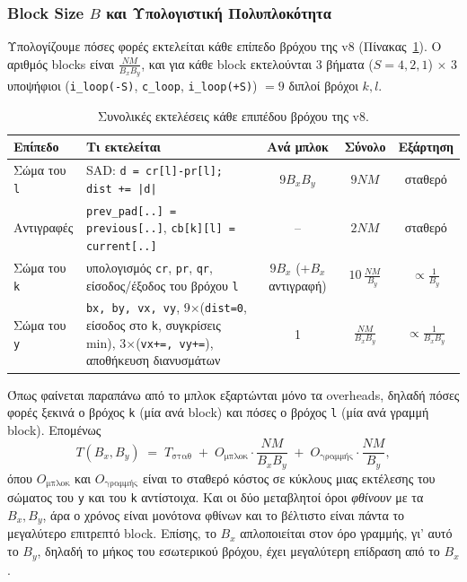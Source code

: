 \documentclass[11pt,a4paper]{article}
\newcommand{\code}[1]{\texttt{#1}}
\newcommand{\en}[1]{\foreignlanguage{english}{#1}}
\begin{document}
\subsubsection*{Block Size $B$ και Υπολογιστική Πολυπλοκότητα}

Υπολογίζουμε πόσες φορές εκτελείται κάθε επίπεδο
βρόχου της v8 (Πίνακας~\ref{tab:loop_levels}). Ο αριθμός blocks είναι $\frac{NM}{B_xB_y}$, και για
κάθε block εκτελούνται 3 βήματα ($S=4,2,1$) $\times$ 3 υποψήφιοι (\code{i\_loop(-S)},
\code{c\_loop}, \code{i\_loop(+S)}) $=9$ διπλοί βρόχοι $k,l$.

\begin{table}[H]
\centering
\caption{Συνολικές εκτελέσεις κάθε επιπέδου βρόχου της v8.}
\label{tab:loop_levels}
\small
\begin{tabularx}{\textwidth}{@{}l X c c c@{}}
\toprule
\textbf{Επίπεδο} & \textbf{Τι εκτελείται} & \textbf{Ανά μπλοκ} & \textbf{Σύνολο} & \textbf{Εξάρτηση} \\
\midrule
Σώμα του \code{l} &
  SAD: \code{d = cr[l]-pr[l]; dist += |d|} &
  $9B_xB_y$ & $9NM$ & σταθερό \\
Αντιγραφές &
  \code{prev\_pad[..] = previous[..]}, \code{cb[k][l] = current[..]} &
  -- & $2NM$ & σταθερό \\
\midrule
Σώμα του \code{k} &
  υπολογισμός \code{cr}, \code{pr}, \code{qr}, είσοδος/έξοδος του βρόχου \code{l} &
  $9B_x$ (+$B_x$ αντιγραφή) & $10\,\frac{NM}{B_y}$ & $\propto \frac{1}{B_y}$ \\
\midrule
Σώμα του \code{y} &
  \code{bx, by, vx, vy}, 9$\times$(\code{dist=0}, είσοδος στο \code{k}, συγκρίσεις min),
  3$\times$(\code{vx+=, vy+=}), αποθήκευση διανυσμάτων &
  1 & $\frac{NM}{B_xB_y}$ & $\propto \frac{1}{B_xB_y}$ \\
\bottomrule
\end{tabularx}
\end{table}

Όπως φαίνεται παραπάνω από το μπλοκ
εξαρτώνται μόνο τα \en{overheads}, δηλαδή πόσες φορές ξεκινά ο βρόχος \code{k} (μία ανά block) και
πόσες ο βρόχος \code{l} (μία ανά γραμμή block). Επομένως
\begin{equation}
T(B_x,B_y) \;=\; T_{\text{σταθ}} \;+\; O_{\text{μπλοκ}}\cdot\frac{NM}{B_xB_y} \;+\; O_{\text{γραμμής}}\cdot\frac{NM}{B_y},
\label{eq:model}
\end{equation}
όπου $O_{\text{μπλοκ}}$ και $O_{\text{γραμμής}}$ είναι το σταθερό κόστος σε κύκλους μιας εκτέλεσης του
σώματος του \code{y} και του \code{k} αντίστοιχα. Και οι δύο μεταβλητοί όροι \emph{φθίνουν} με τα
$B_x, B_y$, άρα ο χρόνος είναι μονότονα φθίνων και το βέλτιστο είναι πάντα το μεγαλύτερο επιτρεπτό
block. Επίσης, το $B_x$ απλοποιείται στον όρο γραμμής, γι' αυτό το $B_y$, δηλαδή το μήκος του εσωτερικού βρόχου, έχει
μεγαλύτερη επίδραση από το $B_x$.
\end{document}
